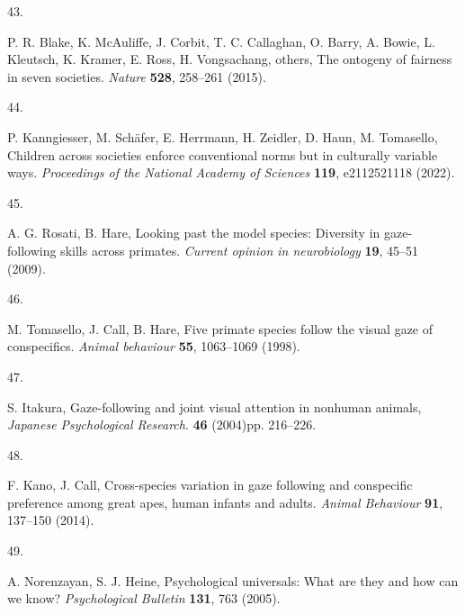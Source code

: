 \documentclass[
  man,floatsintext]{apa6}
\newlength{\cslhangindent}
\newlength{\csllabelwidth}
\newlength{\cslentryspacingunit} %
\newenvironment{CSLReferences}[2] %
 {%
  \setlength{\parindent}{0pt}
  \ifodd #1
  \let\oldpar\par
  \def\par{\hangindent=\cslhangindent\oldpar}
  \fi
  \setlength{\parskip}{#2\cslentryspacingunit}
 }%
 {}
\newcommand{\CSLLeftMargin}[1]{\parbox[t]{\csllabelwidth}{#1}}
\newcommand{\CSLRightInline}[1]{\parbox[t]{\linewidth - \csllabelwidth}{#1}\break}
\begin{document}
\begin{CSLReferences}{0}{0}
\leavevmode{}%
\CSLLeftMargin{43. }%
\CSLRightInline{P. R. Blake, K. McAuliffe, J. Corbit, T. C. Callaghan, O. Barry, A. Bowie, L. Kleutsch, K. Kramer, E. Ross, H. Vongsachang, others, The ontogeny of fairness in seven societies. \emph{Nature} \textbf{528}, 258--261 (2015).}

\leavevmode{}%
\CSLLeftMargin{44. }%
\CSLRightInline{P. Kanngiesser, M. Schäfer, E. Herrmann, H. Zeidler, D. Haun, M. Tomasello, Children across societies enforce conventional norms but in culturally variable ways. \emph{Proceedings of the National Academy of Sciences} \textbf{119}, e2112521118 (2022).}

\leavevmode{}%
\CSLLeftMargin{45. }%
\CSLRightInline{A. G. Rosati, B. Hare, Looking past the model species: Diversity in gaze-following skills across primates. \emph{Current opinion in neurobiology} \textbf{19}, 45--51 (2009).}

\leavevmode{}%
\CSLLeftMargin{46. }%
\CSLRightInline{M. Tomasello, J. Call, B. Hare, Five primate species follow the visual gaze of conspecifics. \emph{Animal behaviour} \textbf{55}, 1063--1069 (1998).}

\leavevmode{}%
\CSLLeftMargin{47. }%
\CSLRightInline{S. Itakura, Gaze-following and joint visual attention in nonhuman animals, \emph{Japanese Psychological Research}. \textbf{46} (2004)pp. 216--226.}

\leavevmode{}%
\CSLLeftMargin{48. }%
\CSLRightInline{F. Kano, J. Call, Cross-species variation in gaze following and conspecific preference among great apes, human infants and adults. \emph{Animal Behaviour} \textbf{91}, 137--150 (2014).}

\leavevmode{}%
\CSLLeftMargin{49. }%
\CSLRightInline{A. Norenzayan, S. J. Heine, Psychological universals: What are they and how can we know? \emph{Psychological Bulletin} \textbf{131}, 763 (2005).}

\end{CSLReferences}
\end{document}
